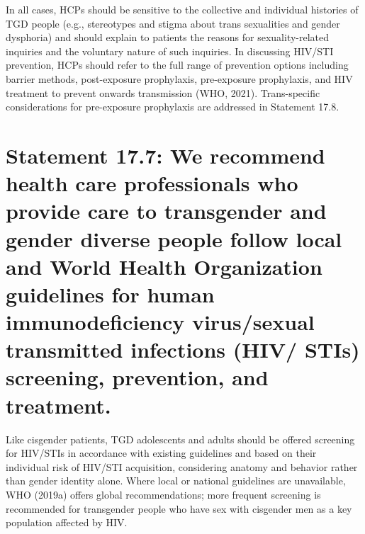 \documentclass[
]{book}
\begin{document}
In all cases, HCPs should be sensitive to the
collective and individual histories of TGD people
(e.g., stereotypes and stigma about trans sexualities and gender dysphoria) and should explain to
patients the reasons for sexuality-related inquiries
and the voluntary nature of such inquiries. In
discussing HIV/STI prevention, HCPs should refer
to the full range of prevention options including
barrier methods, post-exposure prophylaxis,
pre-exposure prophylaxis, and HIV treatment to
prevent onwards transmission (WHO, 2021).
Trans-specific considerations for pre-exposure prophylaxis are addressed in Statement 17.8.

\hypertarget{statement-17.7-we-recommend-health-care-professionals-who-provide-care-to-transgender-and-gender-diverse-people-follow-local-and-world-health-organization-guidelines-for-human-immunodeficiency-virussexual-transmitted-infections-hiv-stis-screening-prevention-and-treatment.}{%
\section*{Statement 17.7: We recommend health care professionals who provide care to transgender and gender diverse people follow local and World Health Organization guidelines for human immunodeficiency virus/sexual transmitted infections (HIV/ STIs) screening, prevention, and treatment.}\label{statement-17.7-we-recommend-health-care-professionals-who-provide-care-to-transgender-and-gender-diverse-people-follow-local-and-world-health-organization-guidelines-for-human-immunodeficiency-virussexual-transmitted-infections-hiv-stis-screening-prevention-and-treatment.}}

Like cisgender patients, TGD adolescents and
adults should be offered screening for HIV/STIs
in accordance with existing guidelines and based
on their individual risk of HIV/STI acquisition,
considering anatomy and behavior rather than
gender identity alone. Where local or national
guidelines are unavailable, WHO (2019a) offers
global recommendations; more frequent screening
is recommended for transgender people who have
sex with cisgender men as a key population
affected by HIV.
\end{document}
